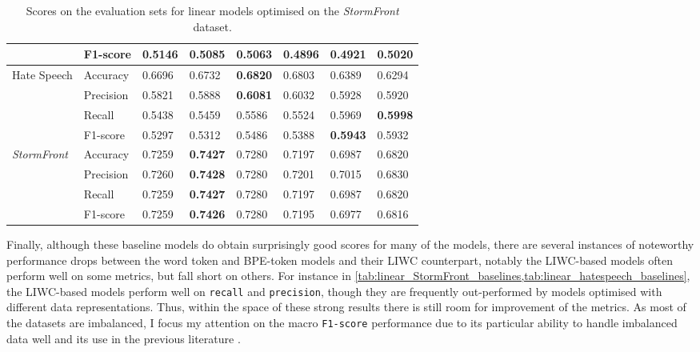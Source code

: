 \begin{table}
{\begin{tabular}{ll|ll|ll|ll}
                                          & F1-score  & \bf{0.5146} & 0.5085        & 0.5063      & 0.4896      & 0.4921      & 0.5020      \\\hline  
    \multirow{4}{*}{Hate Speech}          & Accuracy  & 0.6696      & 0.6732        & \bf{0.6820} & 0.6803      & 0.6389      & 0.6294      \\  
                                          & Precision & 0.5821      & 0.5888        & \bf{0.6081} & 0.6032      & 0.5928      & 0.5920      \\  
                                          & Recall    & 0.5438      & 0.5459        & 0.5586      & 0.5524      & 0.5969      & \bf{0.5998} \\  
                                          & F1-score  & 0.5297      & 0.5312        & 0.5486      & 0.5388      & \bf{0.5943} & 0.5932      \\\hline  
    \multirow{4}{*}{\textit{StormFront}}  & Accuracy  & 0.7259      & \bf{0.7427}   & 0.7280      & 0.7197      & 0.6987      & 0.6820      \\  
                                          & Precision & 0.7260      & \bf{0.7428}   & 0.7280      & 0.7201      & 0.7015      & 0.6830      \\  
                                          & Recall    & 0.7259      & \bf{0.7427}   & 0.7280      & 0.7197      & 0.6987      & 0.6820      \\  
                                          & F1-score  & 0.7259      & \bf{0.7426}   & 0.7280      & 0.7195      & 0.6977      & 0.6816  
    \end{tabular}%
    }  
    \caption{Scores on the evaluation sets for linear models optimised on the \textit{StormFront} dataset.}  
    \label{tab:linear_StormFront_baselines}  
\end{table}  
  
Finally, although these baseline models do obtain surprisingly good scores for many of the models, there are several instances of noteworthy performance drops between the word token and BPE-token models and their LIWC counterpart, notably the LIWC-based models often perform well on some metrics, but fall short on others.  
For instance in \cref{tab:linear_StormFront_baselines,tab:linear_hatespeech_baselines}, the LIWC-based models perform well on \texttt{recall} and \texttt{precision}, though they are frequently out-performed by models optimised with different data representations.  
Thus, within the space of these strong results there is still room for improvement of the metrics.  
As most of the datasets are imbalanced, I focus my attention on the macro \texttt{F1-score} performance due to its particular ability to handle imbalanced data well and its use in the previous literature \citep{Fortuna:2021}.  
  
